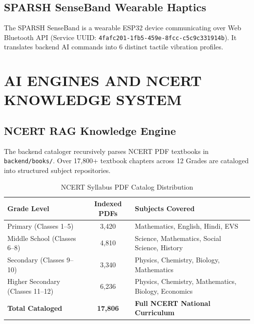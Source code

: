\documentclass[12pt,a4paper]{report}
\begin{document}
\section{SPARSH SenseBand Wearable Haptics}
The SPARSH SenseBand is a wearable ESP32 device communicating over Web Bluetooth API (Service UUID: \texttt{4fafc201-1fb5-459e-8fcc-c5c9c331914b}). It translates backend AI commands into 6 distinct tactile vibration profiles.

\clearpage
\chapter{AI ENGINES AND NCERT KNOWLEDGE SYSTEM}

\section{NCERT RAG Knowledge Engine}
The backend cataloger recursively parses NCERT PDF textbooks in \texttt{backend/books/}. Over 17,800+ textbook chapters across 12 Grades are cataloged into structured subject repositories.

\begin{table}[htbp]
    \centering
    \caption{NCERT Syllabus PDF Catalog Distribution}
    \vspace{0.2cm}
    \renewcommand{\arraystretch}{1.2}
    \begin{tabular}{|l|c|p{}|}
        \hline
        \textbf{Grade Level} & \textbf{Indexed PDFs} & \textbf{Subjects Covered} \\ \hline
        Primary (Classes 1--5) & 3,420 & Mathematics, English, Hindi, EVS \\ \hline
        Middle School (Classes 6--8) & 4,810 & Science, Mathematics, Social Science, History \\ \hline
        Secondary (Classes 9--10) & 3,340 & Physics, Chemistry, Biology, Mathematics \\ \hline
        Higher Secondary (Classes 11--12) & 6,236 & Physics, Chemistry, Mathematics, Biology, Economics \\ \hline
        \textbf{Total Cataloged} & \textbf{17,806} & \textbf{Full NCERT National Curriculum} \\ \hline
    \end{tabular}
\end{table}
\end{document}
